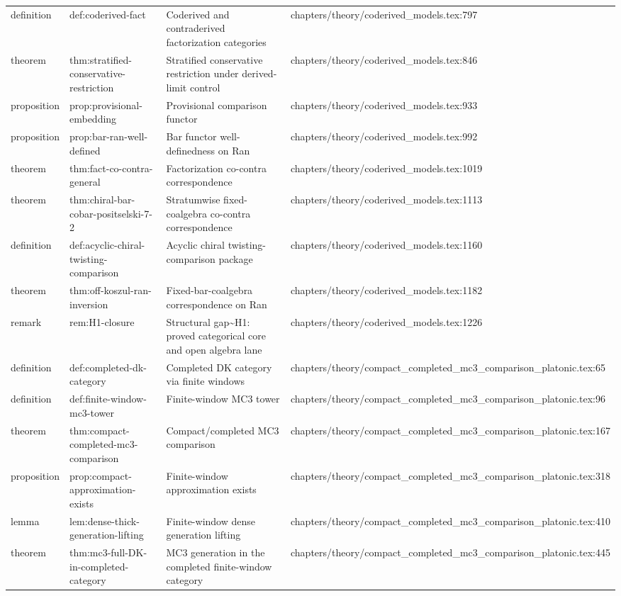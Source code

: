 \documentclass[11pt]{article}
\begin{document}
\begin{longtable}{L{0.10\textwidth}L{0.26\textwidth}L{0.42\textwidth}L{0.22\textwidth}}
definition & def:coderived-fact & Coderived and contraderived factorization categories & chapters/theory/coderived\_models.tex:797\\
theorem & thm:stratified-conservative-restriction & Stratified conservative restriction under derived-limit control & chapters/theory/coderived\_models.tex:846\\
proposition & prop:provisional-embedding & Provisional comparison functor & chapters/theory/coderived\_models.tex:933\\
proposition & prop:bar-ran-well-defined & Bar functor well-definedness on Ran & chapters/theory/coderived\_models.tex:992\\
theorem & thm:fact-co-contra-general & Factorization co-contra correspondence & chapters/theory/coderived\_models.tex:1019\\
theorem & thm:chiral-bar-cobar-positselski-7-2 & Stratumwise fixed-coalgebra co-contra correspondence & chapters/theory/coderived\_models.tex:1113\\
definition & def:acyclic-chiral-twisting-comparison & Acyclic chiral twisting-comparison package & chapters/theory/coderived\_models.tex:1160\\
theorem & thm:off-koszul-ran-inversion & Fixed-bar-coalgebra correspondence on Ran & chapters/theory/coderived\_models.tex:1182\\
remark & rem:H1-closure & Structural gap\textasciitilde{}H1: proved categorical core and op{}en algebra lane & chapters/theory/coderived\_models.tex:1226\\
definition & def:completed-dk-category & Completed DK category via finite windows & chapters/theory/compact\_completed\_mc3\_comparison\_platonic.tex:65\\
definition & def:finite-window-mc3-tower & Finite-window MC3 tower & chapters/theory/compact\_completed\_mc3\_comparison\_platonic.tex:96\\
theorem & thm:compact-completed-mc3-comparison & Compact/completed MC3 comparison & chapters/theory/compact\_completed\_mc3\_comparison\_platonic.tex:167\\
proposition & prop:compact-approximation-exists & Finite-window approximation exists & chapters/theory/compact\_completed\_mc3\_comparison\_platonic.tex:318\\
lemma & lem:dense-thick-generation-lifting & Finite-window dense generation lifting & chapters/theory/compact\_completed\_mc3\_comparison\_platonic.tex:410\\
theorem & thm:mc3-full-DK-in-completed-category & MC3 generation in the completed finite-window category & chapters/theory/compact\_completed\_mc3\_comparison\_platonic.tex:445\\

\end{longtable}
\end{document}
